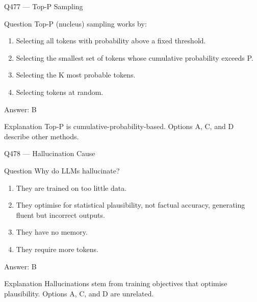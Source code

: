 \documentclass[aspectratio=169,8pt]{beamer}
\begin{document}
	\begin{frame}{Q477 --- Top-P Sampling}
		\begin{block}{Question}
			Top-P (nucleus) sampling works by:
			\begin{enumerate}
				\item Selecting all tokens with probability above a fixed threshold.
				\item Selecting the smallest set of tokens whose cumulative probability exceeds P.
				\item Selecting the K most probable tokens.
				\item Selecting tokens at random.
			\end{enumerate}
		\end{block}
		\begin{exampleblock}{Answer: B}\end{exampleblock}
		\begin{block}{Explanation}
			Top-P is cumulative-probability-based. Options A, C, and D describe other methods.
		\end{block}
	\end{frame}
	
	\begin{frame}{Q478 --- Hallucination Cause}
		\begin{block}{Question}
			Why do LLMs hallucinate?
			\begin{enumerate}
				\item They are trained on too little data.
				\item They optimise for statistical plausibility, not factual accuracy, generating fluent but incorrect outputs.
				\item They have no memory.
				\item They require more tokens.
			\end{enumerate}
		\end{block}
		\begin{exampleblock}{Answer: B}\end{exampleblock}
		\begin{block}{Explanation}
			Hallucinations stem from training objectives that optimise plausibility. Options A, C, and D are unrelated.
		\end{block}
	\end{frame}
	
\end{document}
